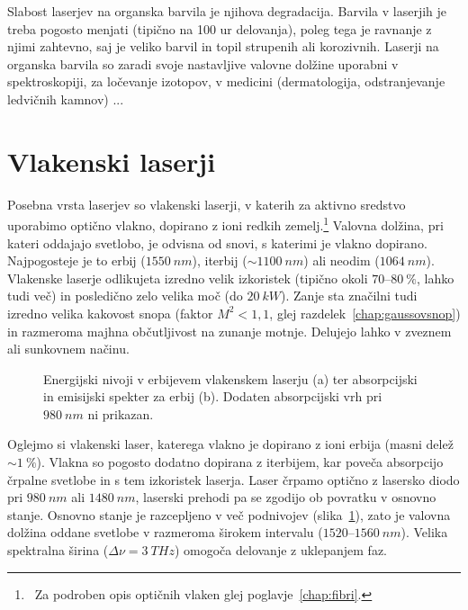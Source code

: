 Slabost laserjev na organska barvila je njihova degradacija. Barvila v
laserjih je treba pogosto menjati (tipično na 100 ur delovanja), poleg tega je ravnanje
z njimi zahtevno, saj je veliko barvil in topil strupenih ali korozivnih.
Laserji na organska barvila so zaradi svoje nastavljive valovne dolžine
uporabni v spektroskopiji, za ločevanje izotopov, v 
medicini (dermatologija, odstranjevanje ledvičnih kamnov) ...
 
\section{Vlakenski laserji}
Posebna vrsta laserjev so vlakenski laserji, v katerih za aktivno 
sredstvo uporabimo optično vlakno, dopirano z ioni redkih zemelj.\footnote{~Za
podroben opis optičnih vlaken glej poglavje~\ref{chap:fibri}.}
Valovna dolžina, pri kateri oddajajo svetlobo, je odvisna od snovi, s katerimi
je vlakno dopirano. Najpogosteje je to erbij ($1550~\si{nm}$),
iterbij ($\sim 1100~\si{nm}$) ali neodim ($1064~\si{nm}$).
Vlakenske laserje odlikujeta
izredno velik izkoristek (tipično okoli $70$--$80~\%$, lahko tudi več) 
in posledično zelo velika moč (do $20~\si{kW}$). Zanje sta značilni tudi
izredno velika kakovost snopa (faktor $M^2<1,1$, glej razdelek~\ref{chap:gaussovsnop}) in 
razmeroma majhna občutljivost na zunanje motnje. Delujejo lahko v zveznem
ali sunkovnem načinu.

\begin{figure}[ht]
\centering
\def\svgwidth{130truemm} 

\caption{Energijski nivoji v erbijevem vlakenskem laserju (a) ter 
absorpcijski in emisijski spekter za erbij (b). Dodaten absorpcijski 
vrh pri $980~\si{nm}$ ni prikazan.}
\label{fig:ErFib}
\end{figure} 

Oglejmo si vlakenski laser, katerega vlakno je dopirano z ioni erbija 
(masni delež $\sim 1~\%$). Vlakna so pogosto dodatno dopirana z iterbijem, kar
poveča absorpcijo črpalne svetlobe in s tem izkoristek laserja. Laser črpamo
optično z lasersko diodo pri $980~\si{nm}$ ali $1480~\si{nm}$, laserski prehodi 
pa se zgodijo ob povratku v osnovno stanje. Osnovno stanje je razcepljeno v več podnivojev
(slika~\ref{fig:ErFib}), zato je valovna dolžina oddane svetlobe v razmeroma 
širokem intervalu ($1520$--$1560~\si{nm}$). Velika spektralna širina
($\Delta \nu = 3~\si{THz}$)
omogoča delovanje z uklepanjem faz. 

